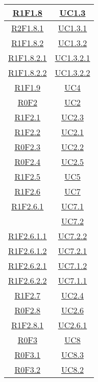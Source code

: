 \begin{longtable}{|c|c|}
\hline
\hyperlink{R1F1.8}{R1F1.8} & \hyperlink{UC1.3}{UC1.3}\\
\hline
\hyperlink{R2F1.8.1}{R2F1.8.1} & \hyperlink{UC1.3.1}{UC1.3.1}\\
\hline
\hyperlink{R1F1.8.2}{R1F1.8.2} & \hyperlink{UC1.3.2}{UC1.3.2}\\
\hline
\hyperlink{R1F1.8.2.1}{R1F1.8.2.1} & \hyperlink{UC1.3.2.1}{UC1.3.2.1}\\
\hline
\hyperlink{R1F1.8.2.2}{R1F1.8.2.2} & \hyperlink{UC1.3.2.2}{UC1.3.2.2}\\
\hline
\hyperlink{R1F1.9}{R1F1.9} & \hyperlink{UC4}{UC4}\\
\hline
\hyperlink{R0F2}{R0F2} & \hyperlink{UC2}{UC2}\\
\hline
\hyperlink{R1F2.1}{R1F2.1} & \hyperlink{UC2.3}{UC2.3}\\
\hline
\hyperlink{R1F2.2}{R1F2.2} & \hyperlink{UC2.1}{UC2.1}\\
\hline
\hyperlink{R0F2.3}{R0F2.3} & \hyperlink{UC2.2}{UC2.2}\\
\hline
\hyperlink{R0F2.4}{R0F2.4} & \hyperlink{UC2.5}{UC2.5}\\
\hline
\hyperlink{R1F2.5}{R1F2.5} & \hyperlink{UC5}{UC5}\\
\hline
\hyperlink{R1F2.6}{R1F2.6} & \hyperlink{UC7}{UC7}\\
\hline
\hyperlink{R1F2.6.1}{R1F2.6.1} & \hyperlink{UC7.1}{UC7.1}\\
& \hyperlink{UC7.2}{UC7.2}\\
\hline
\hyperlink{R1F2.6.1.1}{R1F2.6.1.1} & \hyperlink{UC7.2.2}{UC7.2.2}\\
\hline
\hyperlink{R1F2.6.1.2}{R1F2.6.1.2} & \hyperlink{UC7.2.1}{UC7.2.1}\\
\hline
\hyperlink{R1F2.6.2.1}{R1F2.6.2.1} & \hyperlink{UC7.1.2}{UC7.1.2}\\
\hline
\hyperlink{R1F2.6.2.2}{R1F2.6.2.2} & \hyperlink{UC7.1.1}{UC7.1.1}\\
\hline
\hyperlink{R1F2.7}{R1F2.7} & \hyperlink{UC2.4}{UC2.4}\\
\hline
\hyperlink{R0F2.8}{R0F2.8} & \hyperlink{UC2.6}{UC2.6}\\
\hline
\hyperlink{R1F2.8.1}{R1F2.8.1} & \hyperlink{UC2.6.1}{UC2.6.1}\\
\hline
\hyperlink{R0F3}{R0F3} & \hyperlink{UC8}{UC8}\\
\hline
\hyperlink{R0F3.1}{R0F3.1} & \hyperlink{UC8.3}{UC8.3}\\
\hline
\hyperlink{R0F3.2}{R0F3.2} & \hyperlink{UC8.2}{UC8.2}\\

\end{longtable}
